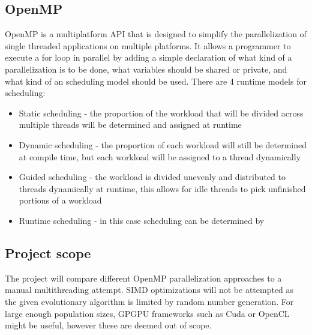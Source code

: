 \documentclass[journal,transmag]{IEEEtran}
\begin{document}
\subsection{OpenMP}
        OpenMP \cite{openmp} is a multiplatform API that is designed to simplify the parallelization of 
        single threaded applications on multiple platforms. It allows a programmer to 
        execute a for loop in parallel by adding a simple declaration of what kind of a 
        parallelization is to be done, what variables should be shared or private, and
        what kind of an scheduling model should be used. There are 4 runtime models for
        scheduling:
        \begin{itemize}
                \item Static scheduling - the proportion of the workload that will be divided across multiple threads
                    will be determined and assigned at runtime
                \item Dynamic scheduling - the proportion of each workload will still be determined
                    at compile time, but each workload will be assigned to a thread dynamically
                \item  Guided scheduling - the workload is divided unevenly and distributed to
                    threads dynamically at runtime, this allows for idle threads to pick unfinished
                    portions of a workload
                   
                \item Runtime scheduling - in this case scheduling can be determined by 
        \end{itemize}

	

\subsection{Project scope}
        The project will compare different OpenMP parallelization approaches to a manual multithreading
        attempt. SIMD optimizations will not be attempted as the given evolutionary algorithm 
        is limited by random number generation. For large enough population sizes, GPGPU frameworks
        such as Cuda or OpenCL might be useful, however these are deemed out of scope.
	
\end{document}
